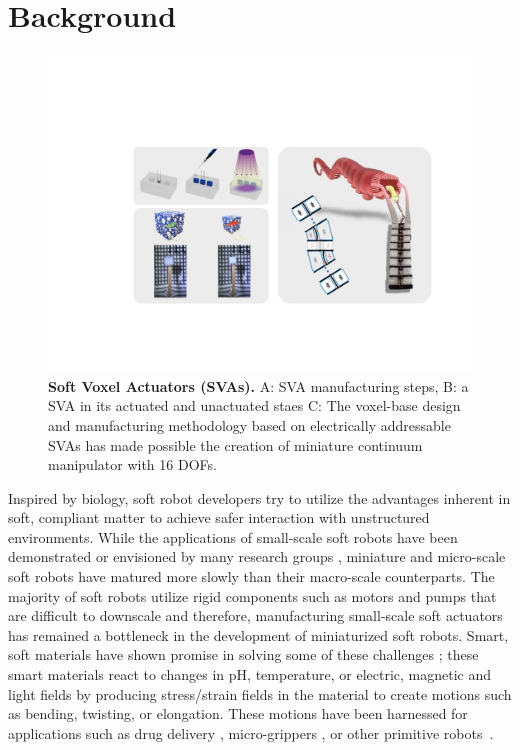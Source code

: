 \section{Background}
\begin{figure}[t]
      \centering
      \includegraphics[width=\textwidth]{concept4.pdf}
      \caption[Soft Voxel Actuators (SVAs)]{\textbf{Soft Voxel Actuators (SVAs).} A: SVA manufacturing steps, B: a SVA in its actuated and unactuated staes C: The voxel-base design and manufacturing methodology based on electrically addressable SVAs has made possible the creation of miniature continuum manipulator with 16 DOFs.}
      \label{fig:conceptSVA}
\end{figure}
Inspired by biology, soft robot developers try to utilize the advantages inherent in soft, compliant matter to achieve safer interaction with unstructured environments.  
While the applications of small-scale soft robots have been demonstrated or envisioned by many research groups \cite{hines2017soft}, miniature and micro-scale soft robots have matured more slowly than their  macro-scale counterparts. The majority of soft robots utilize rigid components such as motors and pumps that are difficult to downscale \cite{majidi2019soft} and therefore, manufacturing small-scale soft actuators has remained a bottleneck in the development of miniaturized soft robots. Smart, soft materials have shown promise in solving some of these challenges \cite{steele2018stimuli, stuart2010emerging,white2013advances}; these smart materials react to changes in pH, temperature, or electric, magnetic and light fields by producing stress/strain fields in the material to create motions such as bending, twisting, or elongation. These motions have been harnessed for applications such as drug delivery \cite{ghosh2017stimuli}, micro-grippers \cite{shintake2018soft}, or other primitive robots~\cite{ionov2014hydrogel}. %

